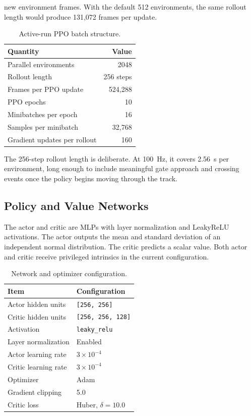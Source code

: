 \documentclass[11pt]{article}
\begin{document}
new environment frames. With the default 512 environments, the same rollout
length would produce 131,072 frames per update.

\begin{table}[H]
\centering
\caption{Active-run PPO batch structure.}
\label{tab:ppo-batch}
\begin{tabular}{lr}
\toprule
\textbf{Quantity} & \textbf{Value} \\
\midrule
Parallel environments & 2048 \\
Rollout length & 256 steps \\
Frames per PPO update & 524,288 \\
PPO epochs & 10 \\
Minibatches per epoch & 16 \\
Samples per minibatch & 32,768 \\
Gradient updates per rollout & 160 \\
\bottomrule
\end{tabular}
\end{table}

The 256-step rollout length is deliberate. At \SI{100}{Hz}, it covers
\SI{2.56}{s} per environment, long enough to include meaningful gate approach
and crossing events once the policy begins moving through the track.

\subsection{Policy and Value Networks}

The actor and critic are MLPs with layer normalization and LeakyReLU
activations. The actor outputs the mean and standard deviation of an independent
normal distribution. The critic predicts a scalar value. Both actor and critic
receive privileged intrinsics in the current configuration.

\begin{table}[H]
\centering
\caption{Network and optimizer configuration.}
\label{tab:networks}
\begin{tabular}{ll}
\toprule
\textbf{Item} & \textbf{Configuration} \\
\midrule
Actor hidden units & \texttt{[256, 256]} \\
Critic hidden units & \texttt{[256, 256, 128]} \\
Activation & \texttt{leaky\_relu} \\
Layer normalization & Enabled \\
Actor learning rate & \(3\times 10^{-4}\) \\
Critic learning rate & \(3\times 10^{-4}\) \\
Optimizer & Adam \\
Gradient clipping & 5.0 \\
Critic loss & Huber, \(\delta = 10.0\) \\
\bottomrule
\end{tabular}
\end{table}
\end{document}
